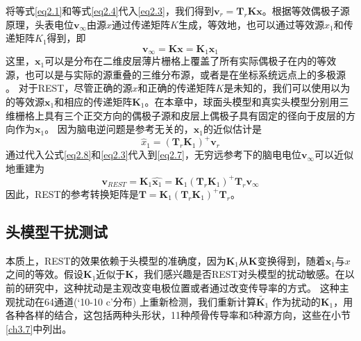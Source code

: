 将等式\eqref{eq2.1}和等式\eqref{eq2.4}代入\eqref{eq2.3}，我们得到$\mathbf{v}_r=\mathbf{T}_{r}\mathbf{Kx}$。根据等效偶极子源原理，头表电位$\mathbf{v}_{\infty}$由源$x$通过传递矩阵$K$生成，等效地，也可以通过等效源$x_1$和传递矩阵$K_1$得到，即
\begin{equation}\label{eq2.7}
\mathbf{v}_{\infty}=\mathbf{Kx}=\mathbf{K}_1\mathbf{x}_1
\end{equation}
这里，$\mathbf{x}_1$可以是分布在二维皮层薄片栅格上覆盖了所有实际偶极子在内的等效源，也可以是与实际的源重叠的三维分布源，或者是在坐标系统远点上的多极源 。 对于REST，尽管正确的源$x$和正确的传递矩阵$K$是未知的，我们可以使用以为的等效源$\mathbf{x}_1$和相应的传递矩阵$\mathbf{K}_1$。在本章中，球面头模型和真实头模型分别用三维栅格上具有三个正交方向的偶极子源和皮层上偶极子具有固定的径向于皮层的方向作为$\mathbf{x}_1$。 因为脑电逆问题是参考无关的，$\mathbf{x}_1$的近似估计是
\begin{equation}\label{eq2.8}
\hat{x}_1=(\mathbf{T}_{r}\mathbf{K}_1)^{+}\mathbf{v}_r
\end{equation}
通过代入公式\eqref{eq2.8}和\eqref{eq2.3}代入到\eqref{eq2.7}，无穷远参考下的脑电电位$\mathbf{v}_{\infty}$可以近似地重建为
\begin{equation}\label{eq2.9}
\mathbf{v}_{REST}=\mathbf{K}_1\hat{\mathbf{x}_1}=\mathbf{K}_1(\mathbf{T}_r\mathbf{K}_1)^+\mathbf{T}_r\mathbf{v}_\infty
\end{equation}
因此，REST的参考转换矩阵是$\mathbf{T}=\mathbf{K}_1(\mathbf{T}_r\mathbf{K}_1)^+\mathbf{T}_r$。
\subsection{头模型干扰测试}
本质上，REST的效果依赖于头模型的准确度，因为$\mathbf{K}_1$从$\mathbf{K}$变换得到，随着$\mathbf{x}_1$与$x$之间的等效。假设$\mathbf{K}_1$近似于$\mathbf{K}$，我们感兴趣是否REST对头模型的扰动敏感。在以前的研究中，这种扰动是主观改变电极位置或者通过改变传导率的方式。 这种主观扰动在64通道(‘10-10 c’分布) 上重新检测，我们重新计算$\tilde{\mathbf{K}_1}$ 作为扰动的$\mathbf{K}_1$，用各种各样的结合，这包括两种头形状，11种颅骨传导率和5种源方向，这些在小节\ref{ch3.7}中列出。

